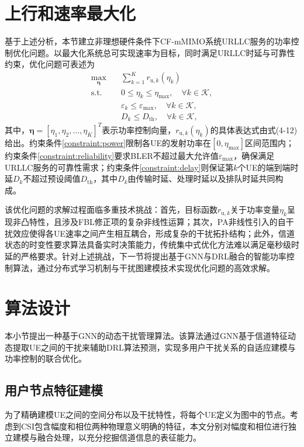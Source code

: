 \section{上行和速率最大化}
基于上述分析，本节建立非理想硬件条件下CF-mMIMO系统URLLC服务的功率控制优化问题。以最大化系统总可实现速率为目标，同时满足URLLC时延与可靠性约束，优化问题可表述为
\begin{align}
\max_{\boldsymbol{\eta}} \quad & \sum_{k=1}^{K} r_{\text{u},k}(\eta_k) \\
\text{s.t.} \quad & 0 \leq \eta_k \leq \eta_{\max}, \quad \forall k \in \mathcal{K}, \label{constraint:power} \\
& \varepsilon_k \leq \varepsilon_{\max}, \quad \forall k \in \mathcal{K}, \label{constraint:reliability} \\
& D_k \leq D_{\text{th}}, \quad \forall k \in \mathcal{K}, \label{constraint:delay}
\end{align}
其中，$\boldsymbol{\eta} = [\eta_1, \eta_2, \ldots, \eta_K]^T$表示功率控制向量，$r_{\text{u},k}(\eta_k)$的具体表达式由式(4-12)给出。约束条件\eqref{constraint:power}限制各UE的发射功率在$[0, \eta_{\max}]$区间范围内；约束条件\eqref{constraint:reliability}要求BLER不超过最大允许值$\varepsilon_{\max}$，确保满足URLLC服务的可靠性需求；约束条件\eqref{constraint:delay}则保证第$k$个UE的端到端时延$D_k$不超过预设阈值$D_{\text{th}}$，其中$D_k$由传输时延、处理时延以及排队时延共同构成。

该优化问题的求解过程面临多重技术挑战：首先，目标函数$r_{\text{u},k}$关于功率变量$\eta_k$呈现非凸特性，且涉及FBL修正项的复杂非线性运算；其次，PA非线性引入的自干扰效应使得各UE速率之间产生相互耦合，形成复杂的干扰拓扑结构；此外，信道状态的时变性要求算法具备实时决策能力，传统集中式优化方法难以满足毫秒级时延的严格要求。针对上述挑战，下一节将提出基于GNN与DRL融合的智能功率控制算法，通过分布式学习机制与干扰图建模技术实现优化问题的高效求解。

\section{算法设计}
本小节提出一种基于GNN的动态干扰管理算法。该算法通过GNN基于信道特征动态提取UE之间的干扰来辅助DRL算法预测，实现多用户干扰关系的自适应建模与功率控制的联合优化。
\subsection{用户节点特征建模}
为了精确建模UE之间的空间分布以及干扰特性，将每个UE定义为图中的节点。考虑到CSI包含幅度和相位两种物理意义明确的特征，本文分别对幅度和相位进行独立建模与融合处理，以充分挖掘信道信息的表征能力。

